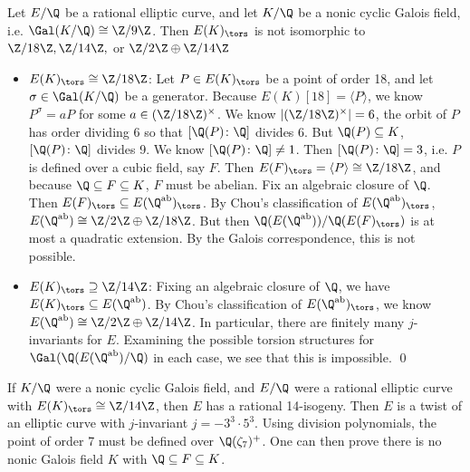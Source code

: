 \begin{frame}[plain]
\footnotesize
\begin{lem}
Let $E/\Q$ be a rational elliptic curve, and let $K/\Q$ be a nonic cyclic Galois field, i.e. $\Gal(K/\Q) \cong \Z/9\Z$. Then $E(K)_\tors$ is not isomorphic to $\Z/18\Z, \Z/14\Z,$ or $\Z/2\Z \oplus \Z/14\Z$  
\end{lem} \pspace

\pf
\begin{itemize}
\item $E(K)_\tors \cong \Z/18\Z$: Let $P \in E(K)_\tors$ be a point of order 18, and let $\sigma \in \Gal(K/\Q)$ be a generator. Because $E(K)[18]= \langle P \rangle$, we know $P^\sigma= aP$ for some $a \in (\Z/18\Z)^\times$. We know $|(\Z/18\Z)^\times|= 6$, the orbit of $P$ has order dividing 6 so that $[\Q(P) \colon \Q]$ divides 6. But $\Q(P) \subseteq K$, $[\Q(P) \colon \Q]$ divides 9. We know $[\Q(P) \colon \Q] \neq 1$. Then $[\Q(P) \colon \Q]= 3$, i.e. $P$ is defined over a cubic field, say $F$. Then $E(F)_\tors= \langle P \rangle \cong \Z/18\Z$, and because $\Q \subseteq F \subseteq K$, $F$ must be abelian. Fix an algebraic closure of $\Q$. Then $E(F)_\tors \subseteq E(\Q^{\text{ab}})_\tors$. By Chou's classification of $E(\Q^{\text{ab}})_\tors$, $E(\Q^{\text{ab}}) \cong \Z/2\Z \oplus \Z/18\Z$. But then $\Q(E(\Q^{\text{ab}}))/\Q(E(F)_\tors)$ is at most a quadratic extension. By the Galois correspondence, this is not possible. 
\end{itemize}
\end{frame}





\begin{frame}[plain,t]
\footnotesize
\vspace{1cm}
\begin{itemize}
\item $E(K)_\tors \supseteq \Z/14\Z$: Fixing an algebraic closure of $\Q$, we have $E(K)_\tors \subseteq E(\Q^{\text{ab}})$. By Chou's classification of $E(\Q^{\text{ab}})_\tors$, we know $E(\Q^{\text{ab}}) \cong \Z/2\Z \oplus \Z/14\Z$. In particular, there are finitely many $j$-invariants for $E$. Examining the possible torsion structures for $\Gal(\Q(E(\Q^{\text{ab}})/\Q)$ in each case, we see that this is impossible. \hfill\qed
\end{itemize} \pspace

\begin{rem}
If $K/\Q$ were a nonic cyclic Galois field, and $E/\Q$ were a rational elliptic curve with $E(K)_\tors \cong \Z/14\Z$, then $E$ has a rational 14-isogeny. Then $E$ is a twist of an elliptic curve with $j$-invariant $j= -3^3 \cdot 5^3$. Using division polynomials, the point of order 7 must be defined over $\Q(\zeta_7)^+$. One can then prove there is no nonic Galois field $K$ with $\Q \subseteq F \subseteq K$. 
\end{rem}
\end{frame}





